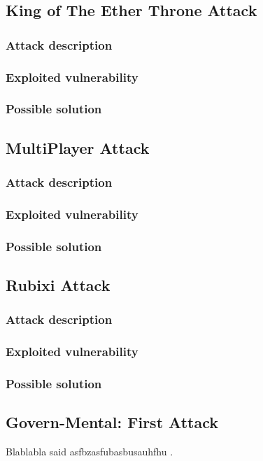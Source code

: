 \subsection{King of The Ether Throne Attack}
\subsubsection{Attack description}
\subsubsection{Exploited vulnerability}
\subsubsection{Possible solution}

\subsection{MultiPlayer Attack}
\subsubsection{Attack description}
\subsubsection{Exploited vulnerability}
\subsubsection{Possible solution}

\subsection{Rubixi Attack}
\subsubsection{Attack description}
\subsubsection{Exploited vulnerability}
\subsubsection{Possible solution}

\subsection{Govern-Mental: First Attack}
Blablabla said asfbzasfubasbusauhfhu \cite{WinNT}.
